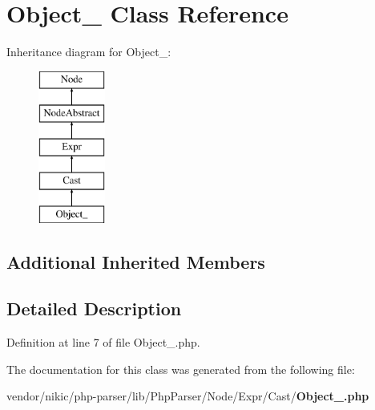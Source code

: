 \section{Object\+\_\+ Class Reference}
\label{class_php_parser_1_1_node_1_1_expr_1_1_cast_1_1_object__}
Inheritance diagram for Object\+\_\+\+:\begin{figure}[H]
\begin{center}
\leavevmode
\includegraphics[height=5.000000cm]{class_php_parser_1_1_node_1_1_expr_1_1_cast_1_1_object__}
\end{center}
\end{figure}
\subsection*{Additional Inherited Members}


\subsection{Detailed Description}


Definition at line 7 of file Object\+\_\+.\+php.



The documentation for this class was generated from the following file\+:\begin{DoxyCompactItemize}
\item 
vendor/nikic/php-\/parser/lib/\+Php\+Parser/\+Node/\+Expr/\+Cast/{\bf Object\+\_\+.\+php}\end{DoxyCompactItemize}
